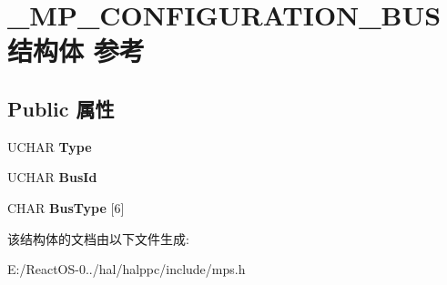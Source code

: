 \hypertarget{struct___m_p___c_o_n_f_i_g_u_r_a_t_i_o_n___b_u_s}{}\section{\+\_\+\+M\+P\+\_\+\+C\+O\+N\+F\+I\+G\+U\+R\+A\+T\+I\+O\+N\+\_\+\+B\+U\+S结构体 参考}
\label{struct___m_p___c_o_n_f_i_g_u_r_a_t_i_o_n___b_u_s}
\subsection*{Public 属性}
\begin{DoxyCompactItemize}
\item 
\mbox{\label{struct___m_p___c_o_n_f_i_g_u_r_a_t_i_o_n___b_u_s_afee0f5cb3a0770163fd878ff946fcb26}} 
U\+C\+H\+AR {\bfseries Type}
\item 
\mbox{\label{struct___m_p___c_o_n_f_i_g_u_r_a_t_i_o_n___b_u_s_af696d160a702c7fa7a5001ddfedc608c}} 
U\+C\+H\+AR {\bfseries Bus\+Id}
\item 
\mbox{\label{struct___m_p___c_o_n_f_i_g_u_r_a_t_i_o_n___b_u_s_a7dbbeb012a5074cdaef16fc24027cf6e}} 
C\+H\+AR {\bfseries Bus\+Type} \mbox{[}6\mbox{]}
\end{DoxyCompactItemize}


该结构体的文档由以下文件生成\+:\begin{DoxyCompactItemize}
\item 
E\+:/\+React\+O\+S-\/0../hal/halppc/include/mps.\+h\end{DoxyCompactItemize}
